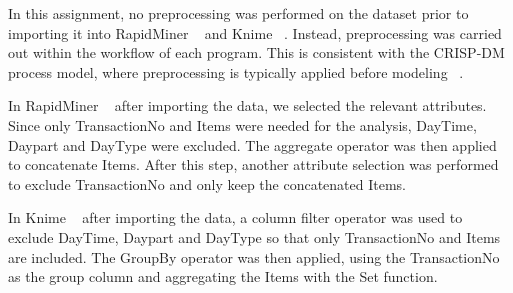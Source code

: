 \label{chap:data-preprocessing}
In this assignment, no preprocessing was performed on the dataset prior to importing it into RapidMiner  ~\cite{RapidMiner} 
and Knime ~\cite{Knime}. Instead, preprocessing was carried out within the workflow of each program. This is consistent with the 
CRISP-DM process model, where preprocessing is typically applied before modeling ~\cite[Ch.~3]{courseLitt}.

In RapidMiner ~\cite{RapidMiner} after importing the data, we selected the relevant attributes. 
Since only TransactionNo and Items were needed for the analysis, DayTime, Daypart and DayType were excluded. 
The aggregate operator was then applied to concatenate Items. After this step, another attribute selection 
was performed to exclude TransactionNo and only keep the concatenated Items. 

In Knime ~\cite{Knime} after importing the data, a column filter operator was used to exclude DayTime, Daypart and DayType 
so that only TransactionNo and Items are included. The GroupBy operator was then applied, using the TransactionNo 
as the group column and aggregating the Items with the Set function. 